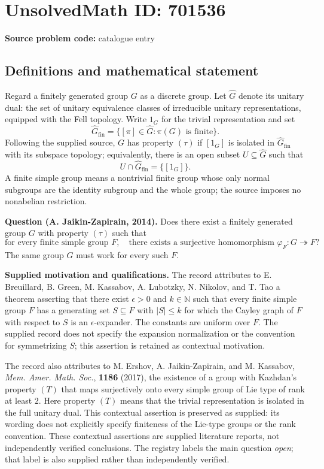 \documentclass[11pt]{article}
\newcommand{\N}{\mathbb{N}}
\begin{document}
\section*{UnsolvedMath ID: 701536}
\textbf{Source problem code:} catalogue entry
\subsection{Definitions and mathematical statement}
Regard a finitely generated group \(G\) as a discrete group. Let \(\widehat G\) denote its unitary dual: the set of unitary equivalence classes of irreducible unitary representations, equipped with the Fell topology. Write \(1_G\) for the trivial representation and set
\[
\widehat G_{\mathrm{fin}}=\{[\pi]\in\widehat G: \pi(G)\text{ is finite}\}.
\]
Following the supplied source, \(G\) has property \((\tau)\) if \([1_G]\) is isolated in \(\widehat G_{\mathrm{fin}}\) with its subspace topology; equivalently, there is an open subset \(U\subseteq\widehat G\) such that
\[
U\cap\widehat G_{\mathrm{fin}}=\{[1_G]\}.
\]
A finite simple group means a nontrivial finite group whose only normal subgroups are the identity subgroup and the whole group; the source imposes no nonabelian restriction.

\textbf{Question (A. Jaikin-Zapirain, 2014).} Does there exist a finitely generated group \(G\) with property \((\tau)\) such that
\[
\text{for every finite simple group }F,\quad
\text{there exists a surjective homomorphism }\varphi_F:G\twoheadrightarrow F?
\]
The same group \(G\) must work for every such \(F\).

\textbf{Supplied motivation and qualifications.} The record attributes to E. Breuillard, B. Green, M. Kassabov, A. Lubotzky, N. Nikolov, and T. Tao a theorem asserting that there exist \(\epsilon>0\) and \(k\in\N\) such that every finite simple group \(F\) has a generating set \(S\subseteq F\) with \(|S|\leq k\) for which the Cayley graph of \(F\) with respect to \(S\) is an \(\epsilon\)-expander. The constants are uniform over \(F\). The supplied record does not specify the expansion normalization or the convention for symmetrizing \(S\); this assertion is retained as contextual motivation.

The record also attributes to M. Ershov, A. Jaikin-Zapirain, and M. Kassabov, \emph{Mem. Amer. Math. Soc.}, \textbf{1186} (2017), the existence of a group with Kazhdan's property \((T)\) that maps surjectively onto every simple group of Lie type of rank at least \(2\). Here property \((T)\) means that the trivial representation is isolated in the full unitary dual. This contextual assertion is preserved as supplied: its wording does not explicitly specify finiteness of the Lie-type groups or the rank convention. These contextual assertions are supplied literature reports, not independently verified conclusions. The registry labels the main question \emph{open}; that label is also supplied rather than independently verified.
\end{document}
